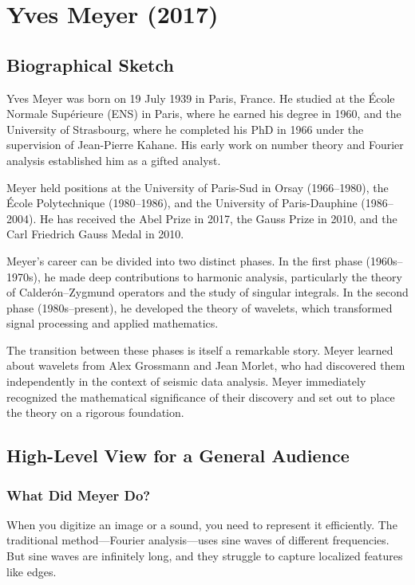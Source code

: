 \chapter{Yves Meyer (2017)}

\section{Biographical Sketch}

Yves Meyer was born on 19 July 1939 in Paris, France. He studied at the \'Ecole Normale Sup\'erieure (ENS) in Paris, where he earned his degree in 1960, and the University of Strasbourg, where he completed his PhD in 1966 under the supervision of Jean-Pierre Kahane. His early work on number theory and Fourier analysis established him as a gifted analyst.

Meyer held positions at the University of Paris-Sud in Orsay (1966--1980), the \'Ecole Polytechnique (1980--1986), and the University of Paris-Dauphine (1986--2004). He has received the Abel Prize in 2017, the Gauss Prize in 2010, and the Carl Friedrich Gauss Medal in 2010.

Meyer's career can be divided into two distinct phases. In the first phase (1960s--1970s), he made deep contributions to harmonic analysis, particularly the theory of Calder\'on--Zygmund operators and the study of singular integrals. In the second phase (1980s--present), he developed the theory of wavelets, which transformed signal processing and applied mathematics.

The transition between these phases is itself a remarkable story. Meyer learned about wavelets from Alex Grossmann and Jean Morlet, who had discovered them independently in the context of seismic data analysis. Meyer immediately recognized the mathematical significance of their discovery and set out to place the theory on a rigorous foundation.

\section{High-Level View for a General Audience}

\subsection{What Did Meyer Do?}

When you digitize an image or a sound, you need to represent it efficiently. The traditional method---Fourier analysis---uses sine waves of different frequencies. But sine waves are infinitely long, and they struggle to capture localized features like edges.

